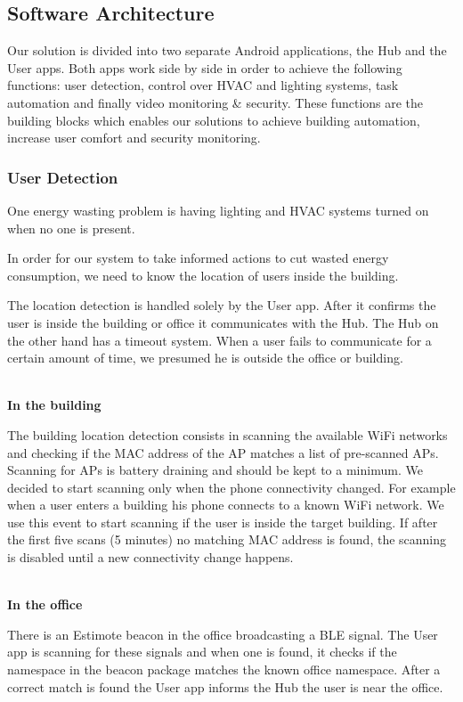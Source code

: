 \documentclass[conference]{IEEEtran}
\begin{document}
\subsection{Software Architecture}

Our solution is divided into two separate Android applications, the Hub and the User apps. Both apps work side by side in order to achieve the following functions: user detection, control over \ac{HVAC} and lighting systems, task automation and finally video monitoring \& security. These functions are the building blocks which enables our solutions to achieve building automation, increase user comfort and security monitoring.


\subsubsection{User Detection}\label{user_detection_imp}

One energy wasting problem is having lighting and \ac{HVAC} systems turned on when no one is present.

In order for our system to take informed actions to cut wasted energy consumption, we need to know the location of users inside the building.


The location detection is handled solely by the User app. After it confirms the user is inside the building or office it communicates with the Hub. The Hub on the other hand has a timeout system. When a user fails to communicate for a certain amount of time, we presumed he is outside the office or building.

\mbox{}\\
\textbf{In the building}

The building location detection consists in scanning the available \ac{WiFi} networks and checking if the \ac{MAC} address of the \ac{AP} matches a list of pre-scanned \ac{AP}s. Scanning for \ac{AP}s is battery draining and should be kept to a minimum. We decided to start scanning only when the phone connectivity changed. For example when a user enters a building his phone connects to a known \ac{WiFi} network. We use this event to start scanning if the user is inside the target building. If after the first five scans (5 minutes) no matching \ac{MAC} address is found, the scanning is disabled until a new connectivity change happens. 

\mbox{}\\
\textbf{In the office}

There is an Estimote beacon in the office broadcasting a \ac{BLE} signal. The User app is scanning for these signals and when one is found, it checks if the namespace in the beacon package matches the known office namespace. After a correct match is found the User app informs the Hub the user is near the office.
\end{document}
